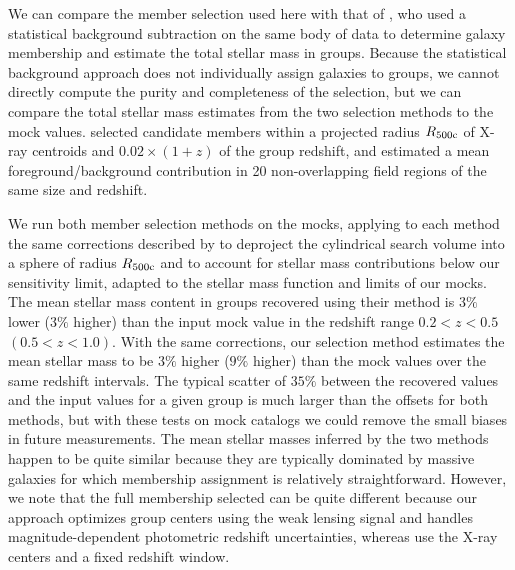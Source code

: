 We can compare the member selection used here with that of
\citet{Giodini2009}, who used a statistical background subtraction on
the same body of data to determine galaxy membership and estimate the total
stellar mass in groups. Because the statistical background approach
does not individually assign galaxies to groups, we cannot
directly compute the purity and completeness of the selection, but we
can compare the total stellar mass estimates from the two selection
methods to the mock values. \citet{Giodini2009} selected candidate members
within a projected radius $R_{500\rm{c}}$ of X-ray centroids and $0.02\times(1+z)$ of the
group redshift, and estimated a mean foreground/background
contribution in 20 non-overlapping field regions of the same size and
redshift. 

We run both member selection methods on the mocks, applying
to each method the same corrections described by \citet{Giodini2009}
to deproject the cylindrical search volume into a sphere of radius
$R_{500\rm{c}}$ and to account for stellar mass contributions below
our sensitivity limit, adapted to the stellar mass function and limits
of our mocks. The mean stellar mass content in groups recovered using
their method is $3\%$ lower ($3\%$ higher) than the input mock value
in the redshift range $0.2<z<0.5$ $(0.5<z<1.0)$. With the same
corrections, our selection method estimates the mean stellar mass to be $3\%$
higher ($9\%$ higher) than the mock values over the same redshift
intervals. The typical scatter of $35\%$ between the recovered values and the
input values for a given group is much larger than the offsets for
both methods, but with these tests on mock catalogs we could remove
the small biases in future measurements. The mean stellar masses
inferred by the two methods happen to be quite similar because they
are typically dominated by massive galaxies for which membership
assignment is relatively straightforward. However, we note
that the full membership selected can be quite different because our approach
optimizes group centers using the weak lensing signal and handles
magnitude-dependent photometric redshift uncertainties, whereas
\citet{Giodini2009} use the X-ray centers and a fixed redshift window. 

